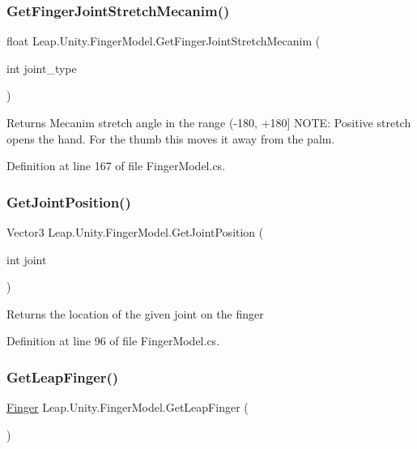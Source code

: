 \subsubsection{\texorpdfstring{GetFingerJointStretchMecanim()}{GetFingerJointStretchMecanim()}}
{\footnotesize\ttfamily float Leap.\+Unity.\+Finger\+Model.\+Get\+Finger\+Joint\+Stretch\+Mecanim (\begin{DoxyParamCaption}\item[{int}]{joint\+\_\+type }\end{DoxyParamCaption})}

Returns Mecanim stretch angle in the range (-\/180, +180\mbox{]} N\+O\+TE\+: Positive stretch opens the hand. For the thumb this moves it away from the palm. 

Definition at line 167 of file Finger\+Model.\+cs.

\mbox{\label{class_leap_1_1_unity_1_1_finger_model_acc14a2149a5a1c8d7277f64db41af544}} 
\subsubsection{\texorpdfstring{GetJointPosition()}{GetJointPosition()}}
{\footnotesize\ttfamily Vector3 Leap.\+Unity.\+Finger\+Model.\+Get\+Joint\+Position (\begin{DoxyParamCaption}\item[{int}]{joint }\end{DoxyParamCaption})}

Returns the location of the given joint on the finger 

Definition at line 96 of file Finger\+Model.\+cs.

\mbox{\label{class_leap_1_1_unity_1_1_finger_model_a053d0477db4bbb6c3353350b769089b3}} 
\subsubsection{\texorpdfstring{GetLeapFinger()}{GetLeapFinger()}}
{\footnotesize\ttfamily \mbox{\hyperlink{class_leap_1_1_finger}{Finger}} Leap.\+Unity.\+Finger\+Model.\+Get\+Leap\+Finger (\begin{DoxyParamCaption}{ }\end{DoxyParamCaption})}

